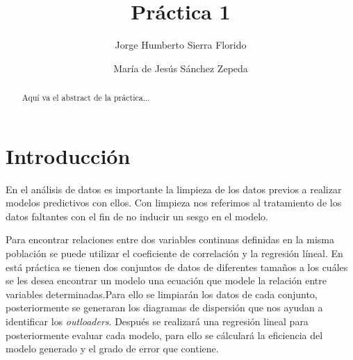 \documentclass[sigconf]{acmart}
\begin{document}
\title{Práctica 1}

\author{Jorge Humberto Sierra Florido}

\author{María de Jesús Sánchez Zepeda}

\begin{abstract}
  Aqu{\'i} va el abstract de la pr{\'a}ctica...
\end{abstract}

\maketitle

\section{Introducción}

En el análisis de datos es importante la limpieza de los datos previos a realizar modelos predictivos con ellos. Con limpieza nos referimos al tratamiento de los datos faltantes con el fin de no inducir un sesgo en el modelo.

Para encontrar relaciones entre dos variables continuas definidas en la misma población se puede utilizar el coeficiente de correlación y la regresión líneal. En está práctica se tienen dos conjuntos de datos de diferentes tamaños a los cuáles se les desea encontrar un modelo una ecuación que modele la relación entre variables determinadas.Para ello se limpiarán los datos de cada conjunto, posteriormente se generaran los diagramas de dispersión que nos ayudan a identificar los \textit{outloaders}. Después se realizará una regresión lineal para posteriormente evaluar cada modelo, para ello se cálculará la eficiencia del modelo generado y el grado de error que contiene.
\end{document}
